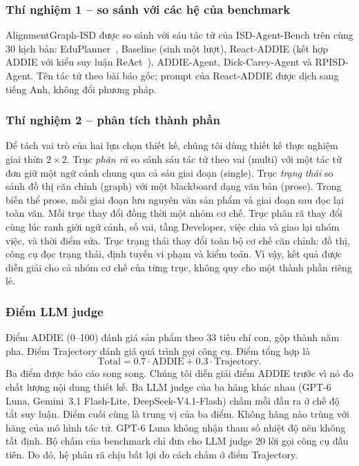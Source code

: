 \documentclass[conference,a4paper]{IEEEtran}
\begin{document}
\subsubsection{Thí nghiệm 1 -- so sánh với các hệ của benchmark}
AlignmentGraph-ISD được so sánh với sáu tác tử của ISD-Agent-Bench trên cùng 30 kịch bản: EduPlanner~\cite{zhang2025eduplanner}, Baseline (sinh một
lượt), React-ADDIE (kết hợp ADDIE với kiểu suy luận ReAct~\cite{yao2023react}),
ADDIE-Agent, Dick-Carey-Agent và RPISD-Agent.
Tên tác tử theo bài báo gốc; prompt của React-ADDIE được dịch sang tiếng Anh, không đổi phương pháp.

\subsubsection{Thí nghiệm 2 -- phân tích thành phần}
Để tách vai trò của hai lựa chọn thiết kế, chúng tôi dùng thiết kế thực nghiệm
giai thừa $2\times2$. Trục \emph{phân rã} so sánh sáu tác tử theo vai (multi) với
một tác tử đơn giữ một ngữ cảnh chung qua cả sáu giai đoạn (single). Trục
\emph{trạng thái} so sánh đồ thị căn chỉnh (graph) với một blackboard dạng văn bản (prose). Trong biến thể prose, mỗi giai đoạn lưu nguyên văn sản phẩm và
giai đoạn sau đọc lại toàn văn. Mỗi trục thay đổi đồng thời một nhóm cơ chế. Trục phân rã thay đổi cùng lúc ranh giới ngữ cảnh, số vai, tầng Developer, việc chia và giao lại nhóm việc, và thời điểm sửa. Trục trạng
thái thay đổi toàn bộ cơ chế căn chỉnh: đồ thị, công cụ đọc trạng thái, định tuyến
vi phạm và kiểm toán. Vì vậy, kết quả được diễn giải cho cả nhóm cơ chế của từng trục, không quy cho một
thành phần riêng lẻ.

\subsubsection{Điểm LLM judge}
Điểm ADDIE (0--100) đánh giá sản phẩm theo 33 tiêu chí con, gộp thành năm pha.
Điểm Trajectory đánh giá quá trình gọi công cụ. Điểm tổng hợp là
\begin{equation}
\label{eq:total}
\mathrm{Total}=0.7\cdot\mathrm{ADDIE}+0.3\cdot\mathrm{Trajectory}.
\end{equation}
Ba điểm được báo cáo song song. Chúng tôi diễn giải điểm ADDIE trước vì nó đo chất lượng nội dung
thiết kế. Ba LLM judge của ba hãng khác nhau (GPT-6 Luna, Gemini~3.1 Flash-Lite, DeepSeek-V4.1-Flash) chấm mỗi đầu ra ở chế độ tắt suy luận. Điểm cuối cùng là trung vị của ba điểm. Không hãng nào trùng với hãng của mô hình tác tử. GPT-6 Luna không nhận tham số nhiệt độ nên không tất định. Bộ chấm của benchmark chỉ
đưa cho LLM judge 20 lời gọi công cụ đầu tiên. Do đó, hệ phân rã chịu bất lợi do
cách chấm ở điểm Trajectory.
\end{document}

